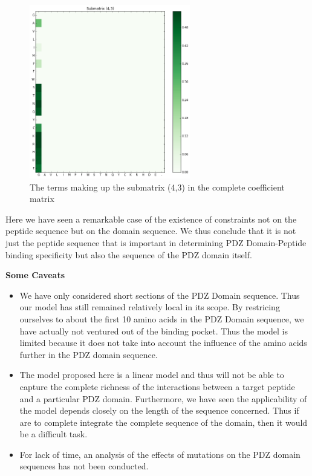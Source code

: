 \documentclass[a4paper, 12pt]{article}
\begin{document}
\begin{enumerate}
\begin{figure}[!h]
\centering
\label{submatrix_43}
\includegraphics[width=7cm]{Images/submatrix_43.png}
\caption{The terms making up the submatrix (4,3) in the complete coefficient matrix}
\end{figure}

Here we have seen a remarkable case of the existence of constraints not on the peptide sequence but on the domain sequence. We thus conclude that it is not just the peptide sequence that is important in determining PDZ Domain-Peptide binding specificity but also the sequence of the PDZ domain itself. 

\end{enumerate}

\textbf{Some Caveats}

\begin{itemize}
\item 
We have only considered short sections of the PDZ Domain sequence. Thus our model has still remained relatively local in its scope. By restricing ourselves to about the first 10 amino acids in the PDZ Domain sequence, we have actually not ventured out of the binding pocket. Thus the model is limited because it does not take into account the influence of the amino acids further in the PDZ domain sequence. 

\item 
The model proposed here is a linear model and thus will not be able to capture the complete richness of the interactions between a target peptide and a particular PDZ domain. Furthermore, we have seen the applicability of the model depends closely on the length of the sequence concerned. Thus if are to complete integrate the complete sequence of the domain, then it would be a difficult task. 

\item 
For lack of time, an analysis of the effects of mutations on the PDZ domain sequences has not been conducted. 
\end{itemize}

\nocite{*}
\printbibliography
\end{document}
